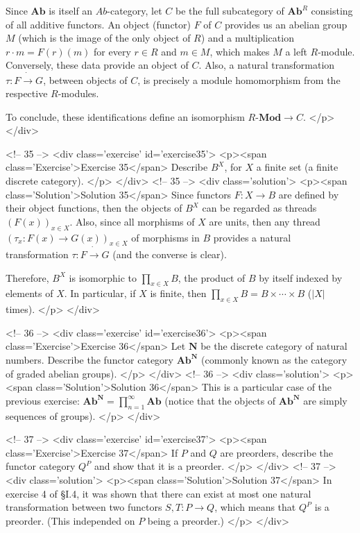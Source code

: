 Since $\mathbf{Ab}$ is itself an $Ab$-category, let $C$ be the full subcategory of $\mathbf{Ab}^R$ consisting of all additive functors. An object (functor) $F$ of $C$ provides us an abelian group $M$ (which is the image of the only object of $R$) and a multiplication $r\cdot m=F(r)(m)$ for every $r\in R$ and $m\in M$, which makes $M$ a left $R$-module. Conversely, these data provide an object of $C$. Also, a natural transformation $\tau:F\dot{\to} G$, between objects of $C$, is precisely a module homomorphism from the respective $R$-modules.

To conclude, these identifications define an isomorphism $R\text{-}\mathbf{Mod}\to C$.
</p>
</div>

<!-- 35 -->
<div class='exercise' id='exercise35'>
<p><span class='Exercise'>Exercise 35</span>
Describe $B^X$, for $X$ a finite set (a finite discrete category).
</p>
</div>
<!-- 35 -->
<div class='solution'>
<p><span class='Solution'>Solution 35</span>
Since functors $F:X\to B$ are defined by their object functions, then the objects of $B^X$ can be regarded as threads $(F(x))_{x\in X}$. Also, since all morphisms of $X$ are units, then any thread $(\tau_x:F(x)\to G(x))_{x\in X}$ of morphisms in $B$ provides a natural transformation $\tau:F\dot{\to}G$ (and the converse is clear).

Therefore, $B^X$ is isomorphic to $\prod_{x\in X} B$, the product of $B$ by itself indexed by elements of $X$. In particular, if $X$ is finite, then $\prod_{x\in X} B=B\times\cdots\times B$ ($|X|$ times).
</p>
</div>

<!-- 36 -->
<div class='exercise' id='exercise36'>
<p><span class='Exercise'>Exercise 36</span>
Let $\mathbf{N}$ be the discrete category of natural numbers. Describe the functor category $\mathbf{Ab}^\mathbf{N}$ (commonly known as the category of graded abelian groups).
</p>
</div>
<!-- 36 -->
<div class='solution'>
<p><span class='Solution'>Solution 36</span>
This is a particular case of the previous exercise: $\mathbf{Ab}^\mathbf{N}=\prod_{n=1}^\infty\mathbf{Ab}$ (notice that the objects of $\mathbf{Ab}^\mathbf{N}$ are simply sequences of groups).
</p>
</div>

<!-- 37 -->
<div class='exercise' id='exercise37'>
<p><span class='Exercise'>Exercise 37</span>
If $P$ and $Q$ are preorders, describe the functor category $Q^P$ and show that it is a preorder.
</p>
</div>
<!-- 37 -->
<div class='solution'>
<p><span class='Solution'>Solution 37</span>
In exercise 4 of \S I.4, it was shown that there can exist at most one natural transformation between two functors $S,T:P\to Q$, which means that $Q^P$ is a preorder. (This independed on $P$ being a preorder.)
</p>
</div>

